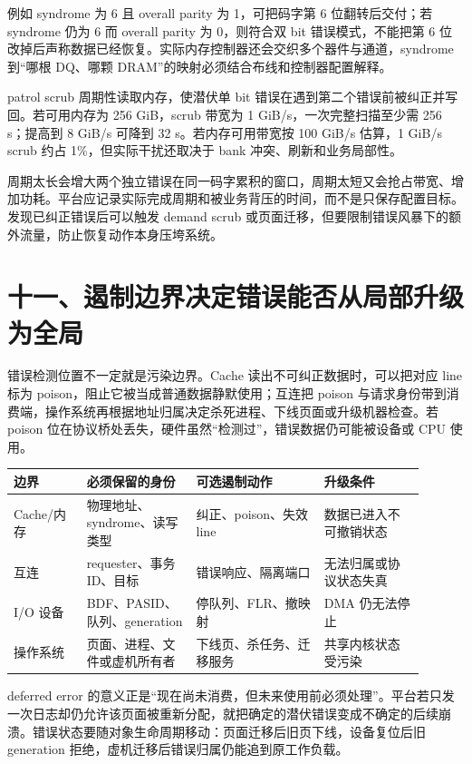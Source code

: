 例如 syndrome 为 6 且 overall parity 为 1，可把码字第 6 位翻转后交付；若 syndrome 仍为 6 而 overall parity 为 0，则符合双 bit 错误模式，不能把第 6 位改掉后声称数据已经恢复。实际内存控制器还会交织多个器件与通道，syndrome 到“哪根 DQ、哪颗 DRAM”的映射必须结合布线和控制器配置解释。


patrol scrub 周期性读取内存，使潜伏单 bit 错误在遇到第二个错误前被纠正并写回。若可用内存为 256 GiB，scrub 带宽为 1 GiB/s，一次完整扫描至少需 256 s；提高到 8 GiB/s 可降到 32 s。若内存可用带宽按 100 GiB/s 估算，1 GiB/s scrub 约占 1\%，但实际干扰还取决于 bank 冲突、刷新和业务局部性。

周期太长会增大两个独立错误在同一码字累积的窗口，周期太短又会抢占带宽、增加功耗。平台应记录实际完成周期和被业务背压的时间，而不是只保存配置目标。发现已纠正错误后可以触发 demand scrub 或页面迁移，但要限制错误风暴下的额外流量，防止恢复动作本身压垮系统。

\section{十一、遏制边界决定错误能否从局部升级为全局}

错误检测位置不一定就是污染边界。Cache 读出不可纠正数据时，可以把对应 line 标为 poison，阻止它被当成普通数据静默使用；互连把 poison 与请求身份带到消费端，操作系统再根据地址归属决定杀死进程、下线页面或升级机器检查。若 poison 位在协议桥处丢失，硬件虽然“检测过”，错误数据仍可能被设备或 CPU 使用。

\begin{longtable}{L{0.16\linewidth}L{0.24\linewidth}L{0.28\linewidth}L{0.22\linewidth}}
\toprule
边界 & 必须保留的身份 & 可选遏制动作 & 升级条件 \\
\midrule
Cache/内存 & 物理地址、syndrome、读写类型 & 纠正、poison、失效 line & 数据已进入不可撤销状态 \\\tablerowrule
互连 & requester、事务 ID、目标 & 错误响应、隔离端口 & 无法归属或协议状态失真 \\\tablerowrule
I/O 设备 & BDF、PASID、队列、generation & 停队列、FLR、撤映射 & DMA 仍无法停止 \\\tablerowrule
操作系统 & 页面、进程、文件或虚机所有者 & 下线页、杀任务、迁移服务 & 共享内核状态受污染 \\
\bottomrule
\end{longtable}

deferred error 的意义正是“现在尚未消费，但未来使用前必须处理”。平台若只发一次日志却仍允许该页面被重新分配，就把确定的潜伏错误变成不确定的后续崩溃。错误状态要随对象生命周期移动：页面迁移后旧页下线，设备复位后旧 generation 拒绝，虚机迁移后错误归属仍能追到原工作负载。

